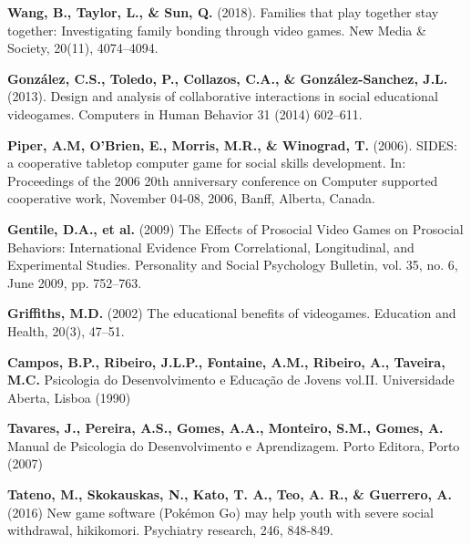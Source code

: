 \documentclass[runningheads]{llncs}
\begin{document}
\begin{thebibliography}{8}

   \textbf{Wang, B., Taylor, L., \& Sun, Q.} (2018). Families that play together stay together: Investigating family bonding through video games. New Media \& Society, 20(11), 4074–4094. 

 \textbf{González, C.S., Toledo, P., Collazos, C.A., \& González-Sanchez, J.L.} (2013). Design and analysis of collaborative interactions in social educational videogames. Computers in Human Behavior 31 (2014) 602–611. 


 \textbf{Piper, A.M, O'Brien, E., Morris, M.R., \& Winograd, T.} (2006). SIDES: a cooperative tabletop computer game for social skills development. In: Proceedings of the 2006 20th anniversary conference on Computer supported cooperative work, November 04-08, 2006, Banff, Alberta, Canada. 

 \textbf{Gentile, D.A., et al.} (2009) The Effects of Prosocial Video Games on Prosocial Behaviors: International Evidence From Correlational, Longitudinal, and Experimental Studies. Personality and Social Psychology Bulletin, vol. 35, no. 6, June 2009, pp. 752–763. 

 \textbf{Griffiths, M.D.} (2002) The educational benefits of videogames. Education and Health, 20(3), 47–51.

 \textbf{Campos, B.P., Ribeiro, J.L.P., Fontaine, A.M., Ribeiro, A., Taveira, M.C.} Psicologia do Desenvolvimento e Educação de Jovens vol.II. Universidade Aberta, Lisboa (1990) 

 \textbf{Tavares, J., Pereira, A.S., Gomes, A.A., Monteiro, S.M., Gomes, A.} Manual de Psicologia do Desenvolvimento e Aprendizagem. Porto Editora, Porto (2007)

 	\textbf{Tateno, M., Skokauskas, N., Kato, T. A., Teo, A. R., \& Guerrero, A.} (2016) New game software (Pokémon Go) may help youth with severe social withdrawal, hikikomori. Psychiatry research, 246, 848-849. 


\end{thebibliography}
\end{document}
